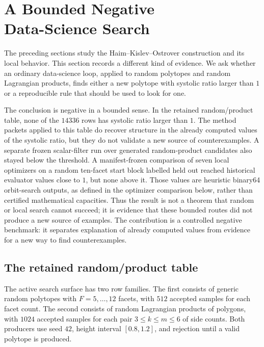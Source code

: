 \section[A Bounded Negative Data-Science Search]{A Bounded Negative\\Data-Science Search}\label{sec:black-box-datascience}

The preceding sections study the Haim--Kislev--Ostrover construction and its
local behavior.  This section records a different kind of evidence.  We ask
whether an ordinary data-science loop, applied to random polytopes and random
Lagrangian products, finds either a new polytope with systolic ratio larger than
\(1\) or a reproducible rule that should be used to look for one.

The conclusion is negative in a bounded sense.  In the retained random/product
table, none of the \(14336\) rows has systolic ratio larger than \(1\).  The
method packets applied to this table do recover structure in the already
computed values of the systolic ratio, but they do not validate a new source of
counterexamples.  A separate frozen scalar-filter run over generated
random-product candidates also stayed below the threshold.  A manifest-frozen
comparison of seven local optimizers on a random ten-facet start block labelled
held out reached historical evaluator values close to \(1\), but none above
it.  Those values are heuristic binary64 orbit-search outputs, as defined in
the optimizer comparison below, rather than certified mathematical capacities.
Thus the result is not a theorem
that random or local search cannot succeed; it is evidence that these bounded
routes did not produce a new source of examples.
The contribution is a controlled negative benchmark: it separates explanation
of already computed values from evidence for a new way to find counterexamples.

\subsection{The retained random/product table}
\label{subsec:black-box-datascience-retained-random-product-table}

The active search surface has two row families.  The first consists of generic
random polytopes with \(F=5,\ldots,12\) facets, with \(512\) accepted samples
for each facet count.  The second consists of random Lagrangian products of
polygons, with \(1024\) accepted samples for each pair \(3\leq k\leq m\leq 6\)
of side counts.  Both producers use seed \(42\), height interval
\([0.8,1.2]\), and rejection until a valid polytope is produced.

